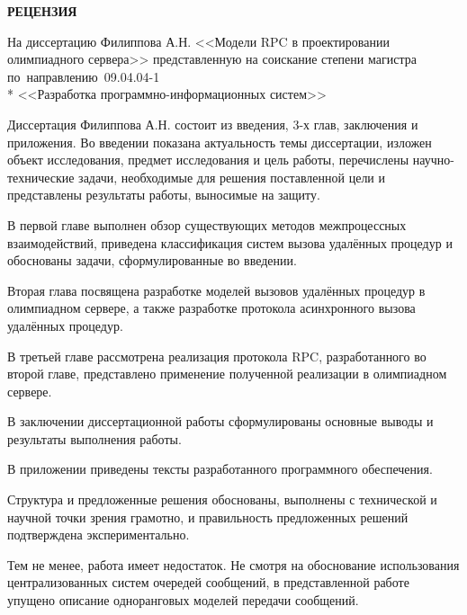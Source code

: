 
\renewcommand{\baselinestretch}{1.3} \setlength{\lineskiplimit}{-10cm}



\begin{titlepage}

\thispagestyle{empty}

\begin{center}
    \large \textbf{\uppercase{Рецензия}}

    \vspace{1em}

    На диссертацию Филиппова А.Н. <<Модели RPC в проектировании олимпиадного
    сервера>> представленную на соискание степени магистра
    по~направлению~09.04.04-1 \\*
    <<Разработка программно-информационных систем>>
\end{center}

\vspace{2em}

Диссертация Филиппова А.Н. состоит из введения, 3-х глав, заключения
и приложения. Во введении показана актуальность темы диссертации, изложен объект
исследования, предмет исследования и цель работы, перечислены научно-технические
задачи, необходимые для решения поставленной цели и представлены результаты
работы, выносимые на защиту.

В первой главе выполнен обзор существующих методов межпроцессных взаимодействий,
приведена классификация систем вызова удалённых процедур и обоснованы задачи,
сформулированные во введении.

Вторая глава посвящена разработке моделей вызовов удалённых процедур
в олимпиадном сервере, а также разработке протокола асинхронного вызова
удалённых процедур.

В третьей главе рассмотрена реализация протокола RPC, разработанного во второй
главе, представлено применение полученной реализации в олимпиадном сервере.

В заключении диссертационной работы сформулированы основные выводы и результаты
выполнения работы.

В приложении приведены тексты разработанного программного обеспечения.

Структура и предложенные решения обоснованы, выполнены с технической
и научной точки зрения грамотно, и правильность предложенных решений
подтверждена экспериментально.

Тем не менее, работа имеет недостаток. Не смотря на обоснование использования
централизованных систем очередей сообщений, в представленной работе упущено
описание одноранговых моделей передачи сообщений.


\end{titlepage}
